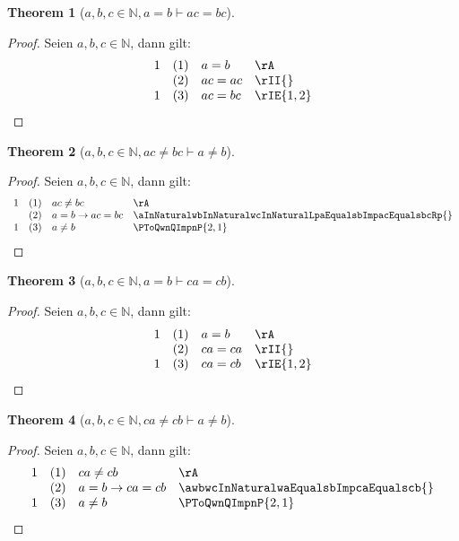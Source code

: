 \documentclass{book}
\theoremstyle{plain}
\newtheorem{theorem}{Theorem}
\theoremstyle{remark}
\theoremstyle{definition}
\begin{document}
\label{aInNaturalwbInNaturalwcInNaturalLpaEqualsbImpacEqualsbcRp}
\begin{theorem}[\(a,b,c\in\mathbb{N},a=b\vdash ac=bc\)]
\end{theorem}
\begin{proof}
Seien \(a,b,c\in\mathbb{N}\), dann gilt:
        \[
	\begin{array}{llll}
            1       &  (1)  & a=b & \rA \\
                    &  (2)  & ac=ac & \rII{} \\
            1       &  (3)  & ac=bc & \rIE{1,2} \\       
	\end{array}
        \]
\end{proof}

\label{awbwcInNaturalwacNotEqualsbcImpaNotEqualsb}
\begin{theorem}[\(a,b,c\in\mathbb{N},ac\neq bc\vdash a\neq b\)]
\end{theorem}
\begin{proof}
Seien \(a,b,c\in\mathbb{N}\), dann gilt:
        \[
	\begin{array}{llll}
            1       &  (1)  & ac\neq bc & \rA \\
                    &  (2)  & a=b\rightarrow ac=bc & \aInNaturalwbInNaturalwcInNaturalLpaEqualsbImpacEqualsbcRp{} \\
            1       &  (3)  & a\neq b & \PToQwnQImpnP{2,1} \\       
	\end{array}
        \]
\end{proof}

\label{awbwcInNaturalwaEqualsbImpcaEqualscb}
\begin{theorem}[\(a,b,c\in\mathbb{N},a=b\vdash ca=cb\)]
\end{theorem}
\begin{proof}
Seien \(a,b,c\in\mathbb{N}\), dann gilt:
        \[
	\begin{array}{llll}
            1       &  (1)  & a=b & \rA \\
                    &  (2)  & ca=ca & \rII{} \\
            1       &  (3)  & ca=cb & \rIE{1,2} \\       
	\end{array}
        \]
\end{proof}

\label{awbwcInNaturalwcaNotEqualscbImpaNotEqualsb}
\begin{theorem}[\(a,b,c\in\mathbb{N},ca\neq cb\vdash a\neq b\)]
\end{theorem}
\begin{proof}
Seien \(a,b,c\in\mathbb{N}\), dann gilt:
        \[
	\begin{array}{llll}
            1       &  (1)  & ca\neq cb & \rA \\
                    &  (2)  & a=b\rightarrow ca=cb & \awbwcInNaturalwaEqualsbImpcaEqualscb{} \\
            1       &  (3)  & a\neq b & \PToQwnQImpnP{2,1} \\       
	\end{array}
        \]
\end{proof}
\end{document}
